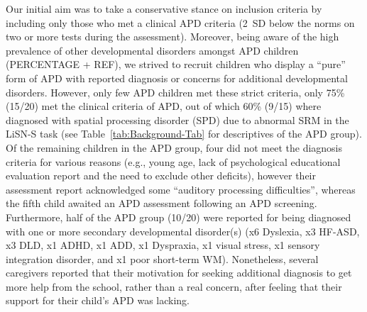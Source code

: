 \documentclass[a4paper, twoside]{templates/ociamthesis}
\begin{document}
Our initial aim was to take a conservative stance on inclusion criteria by including only those who met a clinical APD criteria (2~SD below the norms on two or more tests during the assessment). Moreover, being aware of the high prevalence of other developmental disorders amongst APD children (PERCENTAGE + REF), we strived to recruit children who display a ``pure'' form of APD with reported diagnosis or concerns for additional developmental disorders. However, only few APD children met these strict criteria, only 75\% (15/20) met the clinical criteria of APD, out of which 60\% (9/15) where diagnosed with spatial processing disorder (SPD) due to abnormal SRM in the LiSN-S task (see Table~\ref{tab:Background-Tab} for descriptives of the APD group). Of the remaining children in the APD group, four did not meet the diagnosis criteria for various reasons (e.g., young age, lack of psychological educational evaluation report and the need to exclude other deficits), however their assessment report acknowledged some ``auditory processing difficulties'', whereas the fifth child awaited an APD assessment following an APD screening. Furthermore, half of the APD group (10/20) were reported for being diagnosed with one or more secondary developmental disorder(s) (x6 Dyslexia, x3 HF-ASD, x3 DLD, x1 ADHD, x1 ADD, x1 Dyspraxia, x1 visual stress, x1 sensory integration disorder, and x1 poor short-term WM). Nonetheless, several caregivers reported that their motivation for seeking additional diagnosis to get more help from the school, rather than a real concern, after feeling that their support for their child's APD was lacking.\\

\begin{table}

\caption{\label{tab:Background-Tab}Add caption here.}
\centering
{}
\end{table}
\end{document}
